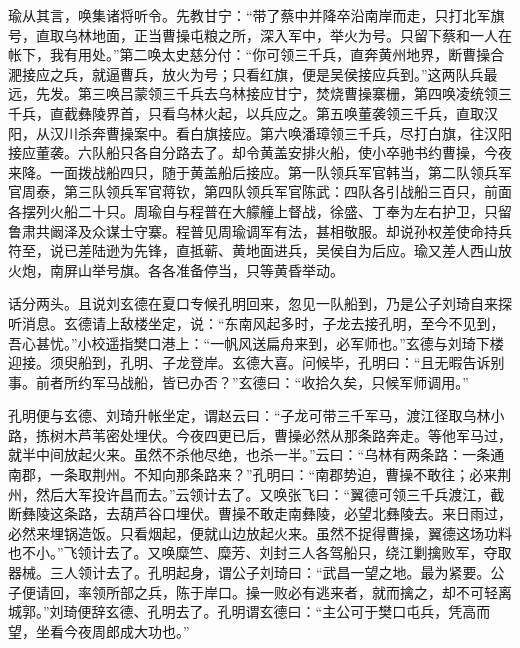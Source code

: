 瑜从其言，唤集诸将听令。先教甘宁：“带了蔡中并降卒沿南岸而走，只打北军旗号，直取乌林地面，正当曹操屯粮之所，深入军中，举火为号。只留下蔡和一人在帐下，我有用处。”第二唤太史慈分付：“你可领三千兵，直奔黄州地界，断曹操合淝接应之兵，就逼曹兵，放火为号；只看红旗，便是吴侯接应兵到。”这两队兵最远，先发。第三唤吕蒙领三千兵去乌林接应甘宁，焚烧曹操寨栅，第四唤凌统领三千兵，直截彝陵界首，只看乌林火起，以兵应之。第五唤董袭领三千兵，直取汉阳，从汉川杀奔曹操案中。看白旗接应。第六唤潘璋领三千兵，尽打白旗，往汉阳接应董袭。六队船只各自分路去了。却令黄盖安排火船，使小卒驰书约曹操，今夜来降。一面拨战船四只，随于黄盖船后接应。第一队领兵军官韩当，第二队领兵军官周泰，第三队领兵军官蒋钦，第四队领兵军官陈武：四队各引战船三百只，前面各摆列火船二十只。周瑜自与程普在大艨艟上督战，徐盛、丁奉为左右护卫，只留鲁肃共阚泽及众谋士守寨。程普见周瑜调军有法，甚相敬服。却说孙权差使命持兵符至，说已差陆逊为先锋，直抵蕲、黄地面进兵，吴侯自为后应。瑜又差人西山放火炮，南屏山举号旗。各各准备停当，只等黄昏举动。

话分两头。且说刘玄德在夏口专候孔明回来，忽见一队船到，乃是公子刘琦自来探听消息。玄德请上敌楼坐定，说：“东南风起多时，子龙去接孔明，至今不见到，吾心甚忧。”小校遥指樊口港上：“一帆风送扁舟来到，必军师也。”玄德与刘琦下楼迎接。须臾船到，孔明、子龙登岸。玄德大喜。问候毕，孔明曰：“且无暇告诉别事。前者所约军马战船，皆已办否？”玄德曰：“收拾久矣，只候军师调用。”

孔明便与玄德、刘琦升帐坐定，谓赵云曰：“子龙可带三千军马，渡江径取乌林小路，拣树木芦苇密处埋伏。今夜四更已后，曹操必然从那条路奔走。等他军马过，就半中间放起火来。虽然不杀他尽绝，也杀一半。”云曰：“乌林有两条路：一条通南郡，一条取荆州。不知向那条路来？”孔明曰：“南郡势迫，曹操不敢往；必来荆州，然后大军投许昌而去。”云领计去了。又唤张飞曰：“翼德可领三千兵渡江，截断彝陵这条路，去葫芦谷口埋伏。曹操不敢走南彝陵，必望北彝陵去。来日雨过，必然来埋锅造饭。只看烟起，便就山边放起火来。虽然不捉得曹操，翼德这场功料也不小。”飞领计去了。又唤糜竺、糜芳、刘封三人各驾船只，绕江剿擒败军，夺取器械。三人领计去了。孔明起身，谓公子刘琦曰：“武昌一望之地。最为紧要。公子便请回，率领所部之兵，陈于岸口。操一败必有逃来者，就而擒之，却不可轻离城郭。”刘琦便辞玄德、孔明去了。孔明谓玄德曰：“主公可于樊口屯兵，凭高而望，坐看今夜周郎成大功也。”


